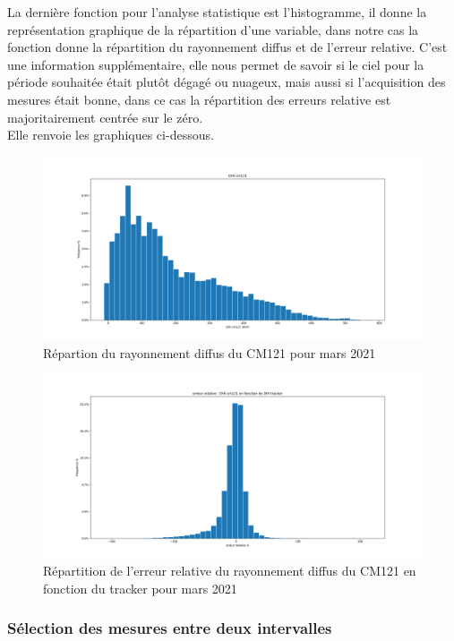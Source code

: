 \documentclass[12pt,a4paper]{article}
\begin{document}
\begin{flushleft}
La dernière fonction pour l'analyse statistique est l'histogramme, il donne la représentation graphique de la répartition d'une variable, dans notre cas la fonction donne la répartition du rayonnement diffus et de l'erreur relative. C'est une information supplémentaire, elle nous permet de savoir si le ciel pour la période souhaitée était plutôt dégagé ou nuageux, mais aussi si l'acquisition des mesures était bonne, dans ce cas la répartition des erreurs relative est majoritairement centrée sur le zéro.\\
Elle renvoie les graphiques ci-dessous.
\begin{figure}[H]
\centering
\includegraphics[width=15cm]{image/histogramme/1.png} 
\caption{Répartion du rayonnement diffus du CM121 pour mars 2021}  
\end{figure}

\begin{figure}[H]
\centering
\includegraphics[width=15cm]{image/histogramme/2.png}  
\caption{Répartition de l'erreur relative du rayonnement diffus du CM121 en fonction du tracker pour mars 2021}  
\end{figure}


\subsubsection{Sélection des mesures entre deux intervalles}


\end{flushleft}
\end{document}
